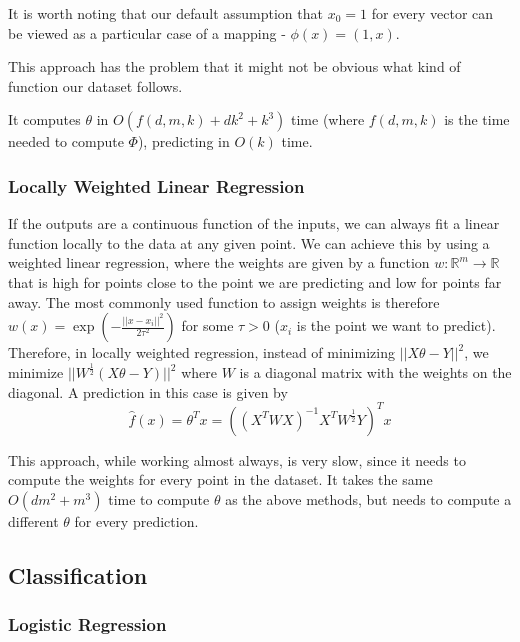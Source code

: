 \documentclass{article}
\newcommand{\R}{\mathbb{R}}
\begin{document}
It is worth noting that our default assumption that $x_0 = 1$ for every vector can be viewed as a particular case of a mapping - $\phi(x) = (1, x)$.

This approach has the problem that it might not be obvious what kind of function our dataset follows.

It computes $\theta$ in $O(f(d,m,k) + dk^2 + k^3)$ time (where $f(d,m,k)$ is the time needed to compute $\Phi$), predicting in $O(k)$ time.

\subsubsection{Locally Weighted Linear Regression}

If the outputs are a continuous function of the inputs, we can always fit a linear function locally to the data at any given point.
We can achieve this by using a weighted linear regression, where the weights are given by a function $w: \R^m \to \R$ that is high for points close to the point we are predicting and low for points far away.
The most commonly used function to assign weights is therefore $w(x) = \exp(-\frac{||x - x_i||^2}{2\tau^2})$ for some $\tau > 0$ ($x_i$ is the point we want to predict).
Therefore, in locally weighted regression, instead of minimizing $||X \theta - Y||^2$, we minimize $||W^{\frac{1}{2}}(X \theta - Y)||^2$ where $W$ is a diagonal matrix with the weights on the diagonal.
A prediction in this case is given by
$$
\hat{f}(x) = \theta^T x = ((X^T W X)^{-1} X^T W^{\frac{1}{2}} Y)^T x
$$

This approach, while working almost always, is very slow, since it needs to compute the weights for every point in the dataset.
It takes the same $O(dm^2 + m^3)$ time to compute $\theta$ as the above methods, but needs to compute a different $\theta$ for every prediction.

\subsection{Classification}

\subsubsection{Logistic Regression}
\end{document}
